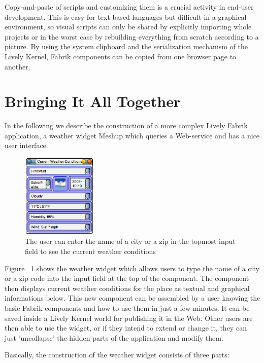 \documentclass[pdftex, times, 10pt, twocolumn]{article}
\begin{document}
Copy-and-paste of scripts and customizing them is a crucial activity in end-user development.  This is easy for text-based languages but difficult in a graphical environment, so visual scripts can only be shared by explicitly importing whole projects or in the worst case by rebuilding everything from scratch according to a picture.  By using the system clipboard and the serialization mechanism of the Lively Kernel, Fabrik components can be copied from one browser page to another. 



\section{Bringing It All Together}
In the following we describe the construction of a more complex Lively Fabrik application, a weather widget Meshup which queries a Web-service and has a nice user interface. 



\begin{figure}[h]\centering
\includegraphics[width=0.320000\textwidth]{weatherExample03.png} 

\caption{The user can enter the name of a city or a zip in the topmost input field to see the current weather conditions }
\label{fig:WeatherExample}
\end{figure}
Figure ~\ref{fig:WeatherExample} shows the weather widget which allows users to type the name of a city or a zip code into the input field at the top of the component. The component then displays current weather conditions for the place as textual and graphical informations below. This new component can be assembled by a user knowing the basic Fabrik components and how to use them in just a few minutes. It can be saved inside a Lively Kernel world for publishing it in the Web. Other users are then able to use the widget, or if they intend to extend or change it, they can just 'uncollapse' the hidden parts of the application and modify them. 

Basically, the construction of the weather widget consists of three parts: 
\end{document}
